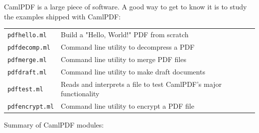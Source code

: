\documentclass[a4paper]{memoir}
\newcommand{\smallgap}{\vspace{4mm}}
\begin{document}
\noindent CamlPDF is a large piece of software. A good way to get to know it is to study the examples shipped with \textsf{CamlPDF}:

\smallgap

{\centering\small
\begin{tabular}{ll}
\texttt{pdfhello.ml} & Build a "Hello, World!" PDF from scratch\\
\texttt{pdfdecomp.ml} & Command line utility to decompress a PDF\\
\texttt{pdfmerge.ml} & Command line utility to merge PDF files\\
\texttt{pdfdraft.ml} & Command line utility to make draft documents\\
\texttt{pdftest.ml} & Reads and interprets a file to test CamlPDF's major functionality\\
\texttt{pdfencrypt.ml} & Command line utility to encrypt a PDF file\\
\end{tabular}
}

\smallgap

\noindent Summary of \textsf{CamlPDF} modules:

\vspace{2mm}
\end{document}
